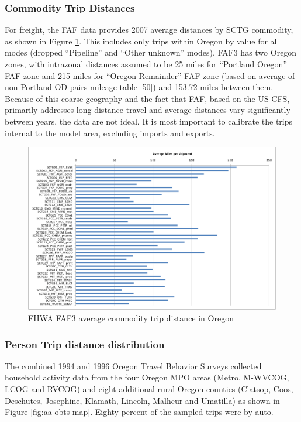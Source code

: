 \subsubsection{Commodity Trip Distances}
For freight, the FAF data provides 2007 average distances by SCTG commodity, as shown in Figure \ref{fig:aa-faf-distances}. This includes only trips within Oregon by value for all modes (dropped ``Pipeline'' and ``Other unknown'' modes). FAF3 has two Oregon zones, with intrazonal distances assumed to be 25 miles for ``Portland Oregon'' FAF zone and 215 miles for ``Oregon Remainder'' FAF zone (based on average of non-Portland OD pairs mileage table [50]) and 153.72 miles between them. Because of this coarse geography and the fact that FAF, based on the US CFS, primarily addresses long-distance travel and average distances vary significantly between years, the data are not ideal. It is most important to calibrate the trips internal to the model area, excluding imports and exports. 

\begin{figure}    %
\centering
\includegraphics[width=6.0in]{aa/faf-distances}
\caption{FHWA FAF3 average commodity trip distance in Oregon}
\label{fig:aa-faf-distances}
\end{figure}

\subsubsection{Person Trip distance distribution}
The combined 1994 and 1996 Oregon Travel Behavior Surveys collected household activity data from the four Oregon MPO areas (Metro, M-WVCOG, LCOG and RVCOG) and eight additional rural Oregon counties (Clatsop, Coos, Deschutes, Josephine, Klamath, Lincoln, Malheur and Umatilla) as shown in Figure \ref{fig:aa-obts-map}. Eighty percent of the sampled trips were by auto. 

